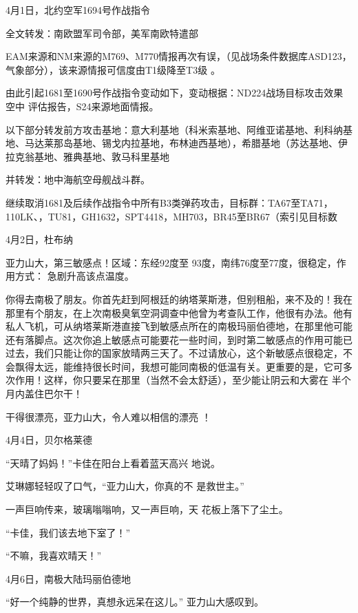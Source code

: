 \documentclass{article}
\begin{document}
4月1日，北约空军1694号作战指令 


全文转发：南欧盟军司令部，美军南欧特遣部

EAM来源和NM来源的M769、M770情报再次有误，（见战场条件数据库ASD123，气象部分），该来源情报可信度由T1级降至T3级
。 

\newpage

由此引起1681至1690号作战指令变动如下，变动根据：ND224战场目标攻击效果空中
评估报告，S24来源地面情报。 

以下部分转发前方攻击基地：意大利基地（科米索基地、阿维亚诺基地、利科纳基地、马达莱那岛基地、锡戈内拉基地，布林迪西基地），希腊基地（苏达基地、伊拉克翁基地、雅典基地、敦马科里基地


并转发：地中海航空母舰战斗群。 

继续取消1681及后续作战指令中所有B3类弹药攻击，目标群：TA67至TA71，110LK、，TU81，GH1632，SPT4418，MH703，BR45至BR67（索引见目标数




4月2日，杜布纳 

亚力山大，第三敏感点！区域：东经92度至
\newpage
93度，南纬76度至77度，很稳定，作用方式：
急剧升高该点温度。 

你得去南极了朋友。你首先赶到阿根廷的纳塔莱斯港，但别租船，来不及的！我在那里有个朋友，在上次南极臭氧空洞调查中他曾为考查队工作，他很有办法。他有私人飞机，可从纳塔莱斯港直接飞到敏感点所在的南极玛丽伯德地，在那里他可能还有落脚点。这次你追上敏感点可能要花一些时间，到时第二敏感点的作用可能已过去，我们只能让你的国家放晴两三天了。不过请放心，这个新敏感点很稳定，不会飘得太远，能维持很长时间，我想可能同南极的低温有关。更重要的是，它可多次作用！这样，你只要呆在那里（当然不会太舒适），至少能让阴云和大雾在
半个月内盖住巴尔干！ 

干得很漂亮，亚力山大，令人难以相信的漂亮
！ 



\newpage

4月4日，贝尔格莱德 

“天晴了妈妈！”卡佳在阳台上看着蓝天高兴
地说。 

艾琳娜轻轻叹了口气，“亚力山大，你真的不
是救世主。” 

一声巨响传来，玻璃嗡嗡响，又一声巨响，天
花板上落下了尘土。 


“卡佳，我们该去地下室了！” 


“不嘛，我喜欢晴天！” 



4月6日，南极大陆玛丽伯德地 

“好一个纯静的世界，真想永远呆在这儿。”
亚力山大感叹到。 
\end{document}
